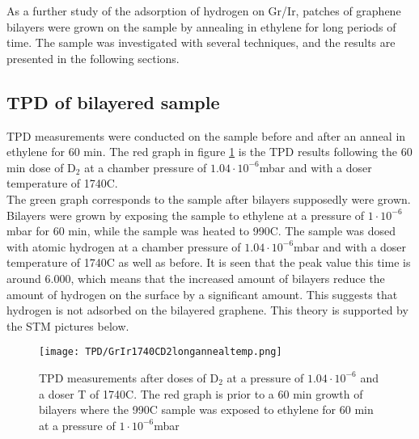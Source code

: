 As a further study of the adsorption of hydrogen on Gr/Ir, patches of graphene bilayers were grown on the sample by annealing in ethylene for long periods of time. The sample was investigated with several techniques, and the results are presented in the following sections.

\subsection{TPD of bilayered sample}
TPD measurements were conducted on the sample before and after an anneal in ethylene for 60 min. The red graph in figure \ref{TPD:bilayer} is the TPD results following the 60 min dose of D$_2$ at a chamber pressure of $1.04\cdot10^{-6}$mbar and with a doser temperature of 1740\degree C. \\
The green graph corresponds to the sample after bilayers supposedly were grown. Bilayers were grown by exposing the sample to ethylene at a pressure of $1\cdot 10^{-6}$mbar for 60 min, while the sample was heated to 990\degree C. The sample was dosed with atomic hydrogen at a chamber pressure of $1.04\cdot 10^{-6}$mbar and with a doser temperature of 1740\degree C as well as before. It is seen that the peak value this time is around 6.000, which means that the increased amount of bilayers reduce the amount of hydrogen on the surface by a significant amount. This suggests that hydrogen is not adsorbed on the bilayered graphene. This theory is supported by the STM pictures below.\\
\begin{figure}[H]
  \centering
  \texttt{[image: TPD/GrIr1740CD2longannealtemp.png]}
  \caption{TPD measurements after doses of D$_2$ at a pressure of $1.04\cdot10^{-6}$ and a doser T of 1740\degree C. The red graph is prior to a 60 min growth of bilayers where the 990\degree C sample was exposed to ethylene for 60 min at a pressure of $1\cdot10^{-6}$mbar}
  \label{TPD:bilayer}
\end{figure}

